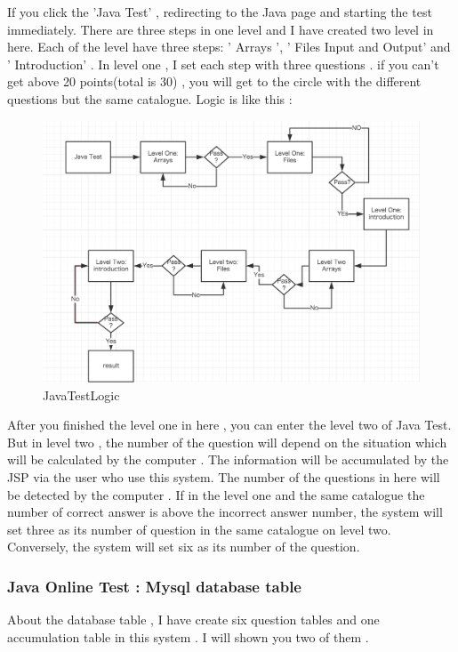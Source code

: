 \documentclass[12pt]{article}
\begin{document}
	If you click the 'Java Test' , redirecting to the Java page and starting the test immediately.  There are three steps in one level and I have created two level in here. Each of the level have three steps: ' Arrays ', ' Files Input and Output' and ' Introduction' . In level one , I set each step with three questions . if you can't get above 20 points(total is 30) , you will get to the circle with the different questions but the same catalogue. 
	Logic is like this :
	\begin{figure}[H]
	\centering	
\includegraphics[width=16cm]{images/JavaTestLogic.jpg}



	\caption[JavaTestLogic]{JavaTestLogic}
	\label{JavaTestLogic}
\end{figure}
	
	
	
	After you finished the level one in here , you can enter the level two of Java Test. But in level two , the number of the question will depend on the situation which will be calculated by the computer . The information will be accumulated by the JSP via the user who use this system. The number of the questions in here will be detected by the computer . If in the level one and the same catalogue the number of correct answer is above the incorrect answer number, the system will set three as its number of question in the same catalogue on level two. Conversely, the system will set six as its number of the question.
	
	
	
	
\cleardoublepage
\subsubsection{Java Online Test : Mysql database table}
	About the database table , I have create six question tables and one accumulation table in this system . I will shown you two of them .
\end{document}
